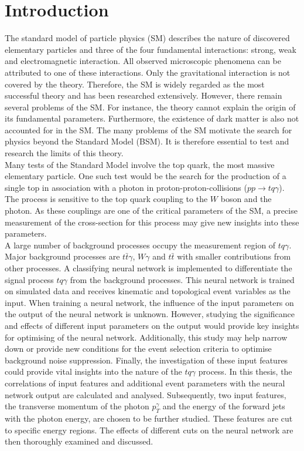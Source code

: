 \chapter{Introduction}


The standard model of particle physics (SM) describes the nature of discovered elementary particles and three of the four fundamental interactions: strong, weak and electromagnetic interaction. 
All observed microscopic phenomena can be attributed to one of these interactions. Only the gravitational interaction is not covered by the theory.  Therefore, the SM is widely regarded as the most successful theory and has been researched extensively. 
However, there remain several problems of the SM. For instance, the theory cannot explain the origin of its fundamental parameters. Furthermore, the existence of dark matter is also not accounted for in the SM. The many problems of the SM motivate the search for physics beyond the Standard Model (BSM). 
It is therefore essential to test and research the limits of this theory.\\
 Many tests of the Standard Model involve the top quark, the most massive elementary particle. One such test would be the search for the production of a single top in association with a photon in proton-proton-collisions ($pp \rightarrow tq\gamma$). 
The process is sensitive to the top quark coupling to the $W$ boson and the photon. As these couplings are one of the critical parameters of the SM, a precise measurement of the cross-section for this process may give new insights into these parameters. \\
 A large number of background processes occupy the measurement region of $tq\gamma$. Major background processes are $t\bar{t}\gamma$, $W\gamma$ and $t\bar{t}$ with smaller contributions from other processes. A classifying neural network is implemented to differentiate 
the signal process $tq\gamma$ from the background processes. This neural network is trained on simulated data and receives kinematic and topological event variables as the input. 
When training a neural network, the influence of the input parameters on the output of the neural network is unknown. However, studying the significance and effects of different input parameters on the output would provide key insights for optimising of the neural network. 
Additionally, this study may help narrow down or provide new conditions for the event selection criteria to optimise background noise suppression. Finally, the investigation of these input features could provide vital insights into the nature of the $tq\gamma$ process. 
In this thesis, the correlations of input features and additional event parameters with the neural network output are calculated and analysed. Subsequently, two input features, the transverse momentum of the photon $p_T^\gamma$ and the energy of the forward jets with the photon energy, are chosen to be further studied. 
These features are cut to specific energy regions. The effects of different cuts on the neural network are then thoroughly examined and discussed. 

